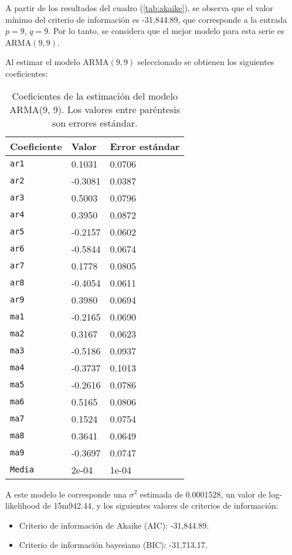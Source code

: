 \documentclass{article}
\begin{document}
A partir de los resultados del cuadro (\ref{tab:akaike}), se observa que el valor mínimo del criterio de información es -31,844.89, que corresponde a la entrada $p=9$, $q=9$. Por lo tanto, se considera que el mejor modelo para esta serie es $\mathrm{ARMA}(9, 9)$.

Al estimar el modelo $\mathrm{ARMA}(9, 9)$ seleccionado se obtienen los siguientes coeficientes:

\begin{table}[H]
\centering
\begin{tabularx}{0.6\textwidth}{XYY}
\toprule
Coeficiente & Valor & Error estándar \\
\midrule
\texttt{ar1} & 0.1031 & 0.0706 \\
\texttt{ar2} & -0.3081 & 0.0387 \\
\texttt{ar3} & 0.5003 & 0.0796 \\
\texttt{ar4} & 0.3950 & 0.0872 \\
\texttt{ar5} & -0.2157 & 0.0602 \\
\texttt{ar6} & -0.5844 & 0.0674 \\
\texttt{ar7} & 0.1778 & 0.0805 \\
\texttt{ar8} & -0.4054 & 0.0611 \\
\texttt{ar9} & 0.3980 & 0.0694 \\
\texttt{ma1} & -0.2165 & 0.0690 \\
\texttt{ma2} & 0.3167 & 0.0623 \\
\texttt{ma3} & -0.5186 & 0.0937 \\
\texttt{ma4} & -0.3737 & 0.1013 \\
\texttt{ma5} & -0.2616 & 0.0786 \\
\texttt{ma6} & 0.5165 & 0.0806 \\
\texttt{ma7} & 0.1524 & 0.0754 \\
\texttt{ma8} & 0.3641 & 0.0649 \\
\texttt{ma9} & -0.3697 & 0.0747 \\
\texttt{Media} & 2e-04 & 1e-04 \\
\bottomrule
\end{tabularx}
\caption{\label{tab:arma-9-9}Coeficientes de la estimación del modelo ARMA(9, 9). Los valores entre paréntesis son errores estándar.}
\end{table}

A este modelo le corresponde una $\sigma^2$ estimada de 0.0001528, un valor de log-likelihood de 15m942.44, y los siguientes valores de criterios de información:
\begin{itemize}
\item Criterio de información de Akaike (AIC): -31,844.89.
\item Criterio de información bayesiano (BIC): -31,713.17.
\end{itemize}
\end{document}
